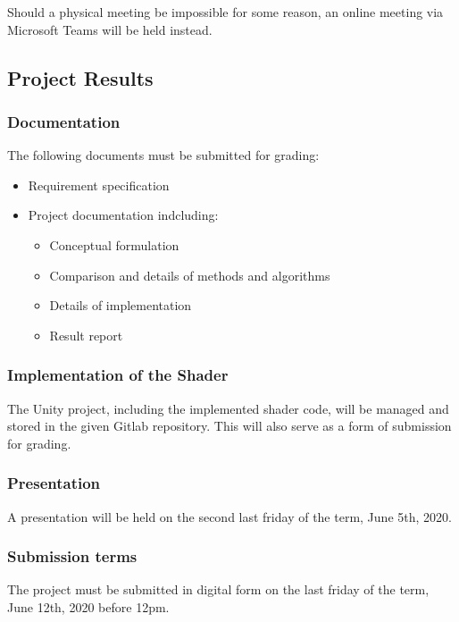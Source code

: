 \vspace{\baselineskip}
\noindent Should a physical meeting be impossible for some reason, an online meeting via Microsoft Teams will be held instead.


\subsection{Project Results}

\subsubsection{Documentation}
The following documents must be submitted for grading:
\begin{itemize}
    \item Requirement specification
    \item Project documentation indcluding:
    \begin{itemize}
        \item Conceptual formulation
        \item Comparison and details of methods and algorithms
        \item Details of implementation
        \item Result report
    \end{itemize}
\end{itemize}

\subsubsection{Implementation of the Shader}
The Unity project, including the implemented shader code, will be managed and stored in the given Gitlab repository\cite{gitlab}. This will also serve as a form of submission for grading.

\subsubsection{Presentation}
A presentation will be held on the second last friday of the term, June 5th, 2020.

\subsubsection{Submission terms}
The project must be submitted in digital form on the last friday of the term, June 12th, 2020 before 12pm.